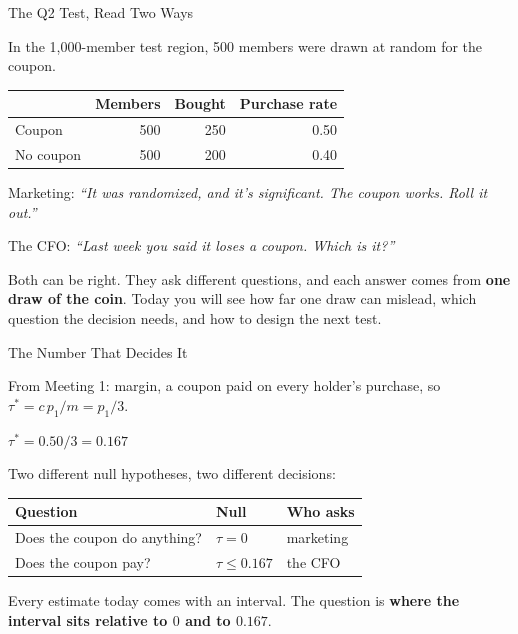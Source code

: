 \documentclass[aspectratio=169, 11pt, handout]{beamer}
\begin{document}
\begin{frame}{The Q2 Test, Read Two Ways}

In the 1{,}000-member test region, 500 members were drawn at random for the  coupon.

\begin{center}
\begin{tabular}{lrrr}
\toprule
& \textbf{Members} & \textbf{Bought} & \textbf{Purchase rate} \\
\midrule
Coupon & 500 & 250 & 0.50 \\
No coupon & 500 & 200 & 0.40 \\
\bottomrule
\end{tabular}
\end{center}

\bigskip

Marketing: \emph{``It was randomized, and it's significant. The coupon works. Roll it out.''}

\medskip

The CFO: \emph{``Last week you said it loses  a coupon. Which is it?''}

\bigskip

Both can be right. They ask different questions, and each answer comes from \textbf{one draw of the coin}. Today you will see how far one draw can mislead, which question the decision needs, and how to design the next test.
\end{frame}

\begin{frame}{The Number That Decides It}

From Meeting 1:  margin, a  coupon paid on every holder's purchase, so $\tau^\ast = c\,p_1/m = p_1/3$.

\begin{center}
\Large $\tau^{\ast} = 0.50/3 = \mathbf{0.167}$
\end{center}

Two different null hypotheses, two different decisions:

\begin{center}
\begin{tabular}{lll}
\toprule
\textbf{Question} & \textbf{Null} & \textbf{Who asks} \\
\midrule
Does the coupon do anything? & $\tau = 0$ & marketing \\
Does the coupon pay? & $\tau \leq 0.167$ & the CFO \\
\bottomrule
\end{tabular}
\end{center}

\bigskip

Every estimate today comes with an interval. The question is \textbf{where the interval sits relative to $0$ and to $0.167$}.
\end{frame}
\end{document}
